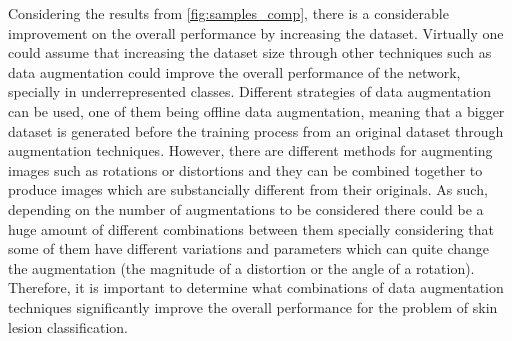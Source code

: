     Considering the results from \ref{fig:samples_comp}, there is a considerable improvement on the overall performance by increasing the dataset. Virtually one could assume that increasing the dataset size through other techniques such as data augmentation could improve the overall performance of the network, specially in underrepresented classes. Different strategies of data augmentation can be used, one of them being offline data augmentation, meaning that a bigger dataset is generated before the training process from an original dataset through augmentation techniques. However, there are different methods for augmenting images such as rotations or distortions and they can be combined together to produce images which are substancially different from their originals. As such, depending on the number of augmentations to be considered there could be a huge amount of different combinations between them specially considering that some of them have different variations and parameters which can quite change the augmentation (the magnitude of a distortion or the angle of a rotation). Therefore, it is important to determine what combinations of data augmentation techniques significantly improve the overall performance for the problem of skin lesion classification. \par
    
